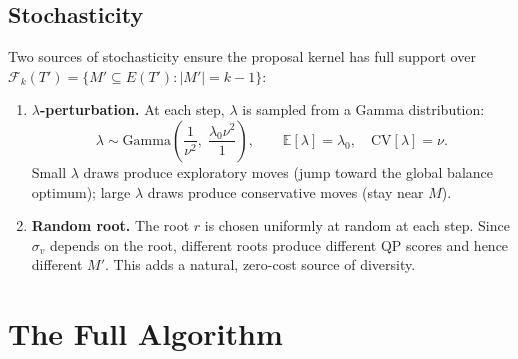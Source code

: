 \documentclass[11pt]{article}
\begin{document}
\subsection{Stochasticity}

Two sources of stochasticity ensure the proposal kernel has full support over $\mathcal{F}_k(T') = \{M' \subseteq E(T') : |M'| = k-1\}$:

\begin{enumerate}
\item \textbf{$\lambda$-perturbation.} At each step, $\lambda$ is sampled from a Gamma distribution:
\[
\lambda \sim \mathrm{Gamma}\!\left(\frac{1}{\nu^2},\; \frac{\lambda_0 \nu^2}{1}\right), \qquad \mathbb{E}[\lambda] = \lambda_0, \quad \mathrm{CV}[\lambda] = \nu.
\]
Small $\lambda$ draws produce exploratory moves (jump toward the global balance optimum); large $\lambda$ draws produce conservative moves (stay near $M$).

\item \textbf{Random root.} The root $r$ is chosen uniformly at random at each step. Since $\sigma_v$ depends on the root, different roots produce different QP scores and hence different $M'$. This adds a natural, zero-cost source of diversity.
\end{enumerate}


\section{The Full Algorithm}\label{sec:algorithm}
\end{document}
